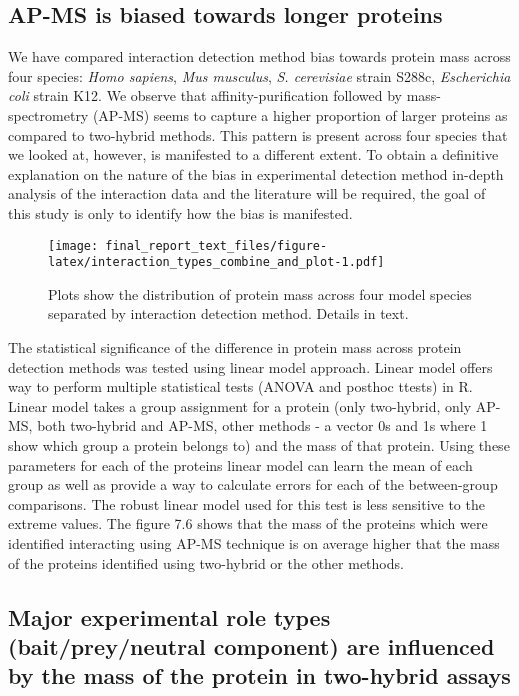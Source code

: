 \documentclass[12pt,]{report}
\begin{document}
\subsection{AP-MS is biased towards longer
proteins}\label{ap-ms-is-biased-towards-longer-proteins}

We have compared interaction detection method bias towards protein mass
across four species: \emph{Homo sapiens}, \emph{Mus musculus}, \emph{S.
cerevisiae} strain S288c, \emph{Escherichia coli} strain K12. We observe
that affinity-purification followed by mass-spectrometry (AP-MS) seems
to capture a higher proportion of larger proteins as compared to
two-hybrid methods. This pattern is present across four species that we
looked at, however, is manifested to a different extent. To obtain a
definitive explanation on the nature of the bias in experimental
detection method in-depth analysis of the interaction data and the
literature will be required, the goal of this study is only to identify
how the bias is manifested.

\begin{figure}
\centering
\texttt{[image: final\_report\_text\_files/figure-latex/interaction\_types\_combine\_and\_plot-1.pdf]}
\caption{Plots show the distribution of protein mass across four model
species separated by interaction detection method. Details in text.}
\end{figure}

The statistical significance of the difference in protein mass across
protein detection methods was tested using linear model approach. Linear
model offers way to perform multiple statistical tests (ANOVA and
posthoc ttests) in R. Linear model takes a group assignment for a
protein (only two-hybrid, only AP-MS, both two-hybrid and AP-MS, other
methods - a vector 0s and 1s where 1 show which group a protein belongs
to) and the mass of that protein. Using these parameters for each of the
proteins linear model can learn the mean of each group as well as
provide a way to calculate errors for each of the between-group
comparisons. The robust linear model used for this test is less
sensitive to the extreme values. The figure 7.6 shows that the mass of
the proteins which were identified interacting using AP-MS technique is
on average higher that the mass of the proteins identified using
two-hybrid or the other methods.

\subsection{Major experimental role types (bait/prey/neutral component)
are influenced by the mass of the protein in two-hybrid
assays}\label{major-experimental-role-types-baitpreyneutral-component-are-influenced-by-the-mass-of-the-protein-in-two-hybrid-assays}
\end{document}
